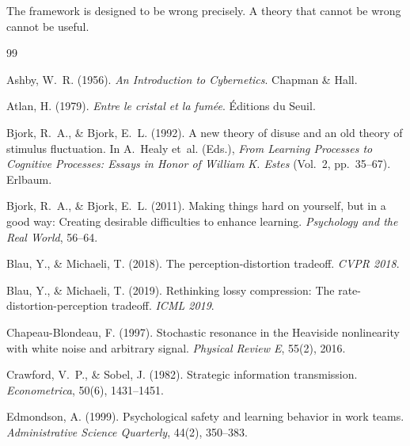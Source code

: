 \documentclass[12pt,letterpaper]{article}
\theoremstyle{definition}
\theoremstyle{remark}
\begin{document}
The framework is designed to be wrong precisely. A theory that cannot be wrong cannot be useful.




\begin{thebibliography}{99}

Ashby, W.~R. (1956).
\newblock \emph{An Introduction to Cybernetics}.
\newblock Chapman \& Hall.

Atlan, H. (1979).
\newblock \emph{Entre le cristal et la fum\'{e}e}.
\newblock \'{E}ditions du Seuil.

Bjork, R.~A., \& Bjork, E.~L. (1992).
\newblock A new theory of disuse and an old theory of stimulus fluctuation.
\newblock In A.~Healy et~al. (Eds.), \emph{From Learning Processes to Cognitive Processes: Essays in Honor of William K. Estes} (Vol.~2, pp.~35--67). Erlbaum.

Bjork, R.~A., \& Bjork, E.~L. (2011).
\newblock Making things hard on yourself, but in a good way: Creating desirable difficulties to enhance learning.
\newblock \emph{Psychology and the Real World}, 56--64.

Blau, Y., \& Michaeli, T. (2018).
\newblock The perception-distortion tradeoff.
\newblock \emph{CVPR 2018}.

Blau, Y., \& Michaeli, T. (2019).
\newblock Rethinking lossy compression: The rate-distortion-perception tradeoff.
\newblock \emph{ICML 2019}.

Chapeau-Blondeau, F. (1997).
\newblock Stochastic resonance in the Heaviside nonlinearity with white noise and arbitrary signal.
\newblock \emph{Physical Review E}, 55(2), 2016.

Crawford, V.~P., \& Sobel, J. (1982).
\newblock Strategic information transmission.
\newblock \emph{Econometrica}, 50(6), 1431--1451.

Edmondson, A. (1999).
\newblock Psychological safety and learning behavior in work teams.
\newblock \emph{Administrative Science Quarterly}, 44(2), 350--383.


\end{thebibliography}
\end{document}
